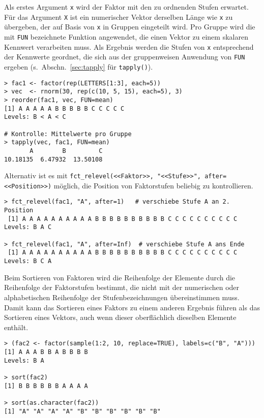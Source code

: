 Als erstes Argument \lstinline!x! wird der Faktor mit den zu ordnenden Stufen erwartet. Für das Argument \lstinline!X! ist ein numerischer Vektor derselben Länge wie \lstinline!x! zu übergeben, der auf Basis von \lstinline!x! in Gruppen eingeteilt wird. Pro Gruppe wird die mit \lstinline!FUN! bezeichnete Funktion angewendet, die einen Vektor zu einem skalaren Kennwert verarbeiten muss. Als Ergebnis werden die Stufen von \lstinline!x! entsprechend der Kennwerte geordnet, die sich aus der gruppenweisen Anwendung von \lstinline!FUN! ergeben (s.\ Abschn.\ \ref{sec:tapply} für \lstinline!tapply()!).
\begin{lstlisting}
> fac1 <- factor(rep(LETTERS[1:3], each=5))
> vec  <- rnorm(30, rep(c(10, 5, 15), each=5), 3)
> reorder(fac1, vec, FUN=mean)
[1] A A A A A B B B B B C C C C C
Levels: B < A < C

# Kontrolle: Mittelwerte pro Gruppe
> tapply(vec, fac1, FUN=mean)
       A        B         C
10.18135  6.47932  13.50108
\end{lstlisting}

Alternativ ist es mit \lstinline!fct_relevel(<<Faktor>>, "<<Stufe>>", after=<<Position>>)! möglich, die Position von Faktorstufen beliebig zu kontrollieren.
\begin{lstlisting}
> fct_relevel(fac1, "A", after=1)   # verschiebe Stufe A an 2. Position
 [1] A A A A A A A A A A B B B B B B B B B B C C C C C C C C C C
Levels: B A C

> fct_relevel(fac1, "A", after=Inf)  # verschiebe Stufe A ans Ende
 [1] A A A A A A A A A A B B B B B B B B B B C C C C C C C C C C
Levels: B C A
\end{lstlisting}

Beim Sortieren von Faktoren wird die Reihenfolge der Elemente durch die Reihenfolge der Faktorstufen bestimmt, die nicht mit der numerischen oder alphabetischen Reihenfolge der Stufenbezeichnungen übereinstimmen muss. Damit kann das Sortieren eines Faktors zu einem anderen Ergebnis führen als das Sortieren eines Vektors, auch wenn dieser oberflächlich dieselben Elemente enthält.
\begin{lstlisting}
> (fac2 <- factor(sample(1:2, 10, replace=TRUE), labels=c("B", "A")))
[1] A A A B B A B B B B
Levels: B A

> sort(fac2)
[1] B B B B B B A A A A

> sort(as.character(fac2))
[1] "A" "A" "A" "A" "B" "B" "B" "B" "B" "B"
\end{lstlisting}

